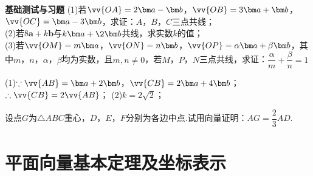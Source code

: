 \begin{exercise}{\textbf{基础测试与习题}}
      (1)若$\vv{OA}=2\bm a-\bm b$，$\vv{OB}=3\bm a+\bm b$，$\vv{OC}=\bm a-3\bm b$，求证：$A$，$B$，$C$三点共线；\\
      (2)若$8\bm a+k\bm b$与$k\bm a+\2\bm b$共线，求实数$k$的值；\\
      (3)若$\vv{OM}=m\bm a$，$\vv{ON}=n\bm b$，$\vv{OP}=\alpha\bm a+\beta\bm b$，其中$m$，$n$，$\alpha$，$\beta$均为实数，且$m,n\neq 0$，若$M$，$P$，$N$三点共线，求证：$\dfrac{\alpha}m+\dfrac{\beta}n=1$
      \begin{answer}
        (1)$\because \vv{AB}=\bm a+2\bm b$，$\vv{CB}=2\bm a+4\bm b$；$\therefore \vv{CB}=2\vv{AB}$；
        (2)$k=2\sqrt2$；
      \end{answer}
      \vspace{5cm}
    \item
      设点$G$为$\triangle ABC$重心，$D$，$E$，$F$分别为各边中点.试用向量证明：$AG=\dfrac23 AD$.
      \begin{flushright}
      \end{flushright}
    \vspace{2cm}
  \end{exercise}
\section{平面向量基本定理及坐标表示}
